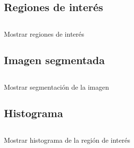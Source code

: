 \subsection{Regiones de interés}
\begin{listing}[!ht]
\inputminted{python}{code_listings/show_roi.py}
\caption{Mostrar regiones de interés}
\label{code:show_roi}
\end{listing}

\subsection{Imagen segmentada}
\begin{listing}[!ht]
\inputminted{python}{code_listings/show_segmentation.py}
\caption{Mostrar segmentación de la imagen}
\label{code:show_segmentation}
\end{listing}

\subsection{Histograma}
\begin{listing}[!ht]
\inputminted{python}{code_listings/show_histogram.py}
\caption{Mostrar histograma de la región de interés}
\label{code:show_histogram}
\end{listing}